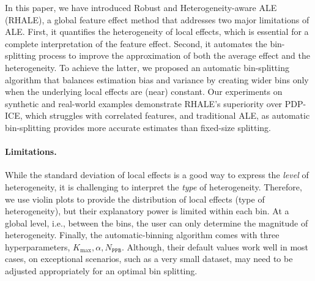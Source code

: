 \documentclass{ecai}  %
\newcommand{\paragraphb}{\vspace{-0.25cm}\paragraph}
\begin{document}
In this paper, we have introduced Robust and Heterogeneity-aware ALE (RHALE), a global feature effect method that addresses two major limitations of ALE. First, it quantifies the heterogeneity of local effects, which is essential for a complete interpretation of the feature effect. Second, it automates the bin-splitting process to improve the approximation of both the average effect and the heterogeneity. To achieve the latter, we proposed an automatic bin-splitting algorithm that balances estimation bias and variance by creating wider bins only when the underlying local effects are (near) constant. Our experiments on synthetic and real-world examples demonstrate RHALE's superiority over PDP-ICE, which struggles with correlated features, and traditional ALE, as automatic bin-splitting provides more accurate estimates than fixed-size splitting.

\paragraphb{Limitations.}
While the standard deviation of local effects is a good way to express the \textit{level} of heterogeneity, it is challenging to interpret the \textit{type} of heterogeneity. Therefore, we use violin plots to provide the distribution of local effects (type of heterogeneity), but their explanatory power is limited within each bin. At a global level, i.e., between the bins, the user can only determine the magnitude of heterogeneity. Finally, the automatic-binning algorithm comes with three hyperparameters, \(K_{\max}, \alpha, N_{\mathtt{PPB}}\). Although, their default values work well in most cases, on exceptional scenarios, such as a very small dataset, may need to be adjusted appropriately for an optimal bin splitting.

\clearpage


\end{document}
